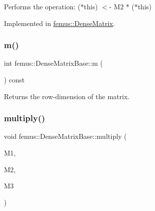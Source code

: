 Performs the operation\+: ($\ast$this) $<$-\/ M2 $\ast$ ($\ast$this) 



Implemented in \mbox{\hyperlink{classfemus_1_1_dense_matrix_a80917b8698400957bc821308be3dafe5}{femus\+::\+Dense\+Matrix}}.

\mbox{\label{classfemus_1_1_dense_matrix_base_a67a582a53ab5ce7628a53f6a90fd39b9}} 
\subsubsection{\texorpdfstring{m()}{m()}}
{\footnotesize\ttfamily int femus\+::\+Dense\+Matrix\+Base\+::m (\begin{DoxyParamCaption}{ }\end{DoxyParamCaption}) const\hspace{0.3cm}{\ttfamily [inline]}}

\begin{DoxyReturn}{Returns}
the row-\/dimension of the matrix. 
\end{DoxyReturn}
\mbox{\label{classfemus_1_1_dense_matrix_base_a57b42c9b3424afaf5203348d816e25d9}} 
\subsubsection{\texorpdfstring{multiply()}{multiply()}}
{\footnotesize\ttfamily void femus\+::\+Dense\+Matrix\+Base\+::multiply (\begin{DoxyParamCaption}\item[{\mbox{\hyperlink{classfemus_1_1_dense_matrix_base}{Dense\+Matrix\+Base}} \&}]{M1,  }\item[{const \mbox{\hyperlink{classfemus_1_1_dense_matrix_base}{Dense\+Matrix\+Base}} \&}]{M2,  }\item[{const \mbox{\hyperlink{classfemus_1_1_dense_matrix_base}{Dense\+Matrix\+Base}} \&}]{M3 }\end{DoxyParamCaption})\hspace{0.3cm}{\ttfamily [protected]}}



